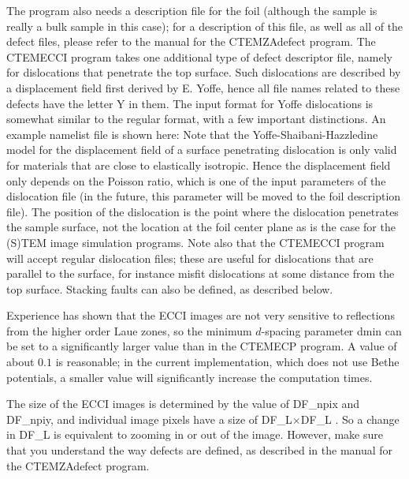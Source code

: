 \documentclass[DIV=calc, paper=letter, fontsize=11pt]{scrartcl}	 %
\begin{document}
The program also needs a description file for the foil (although the sample is really a bulk sample in this case); for a description 
of this file, as well as all of the defect files, please refer to the manual for the \textsf{CTEMZAdefect} program.  The \textsf{CTEMECCI}
program takes one additional type of defect descriptor file, namely for dislocations that penetrate the top surface.  Such dislocations
are described by a displacement field first derived by E. Yoffe, hence all file names related to these defects have the letter Y in them.
The input format for Yoffe dislocations is somewhat similar to the regular format, with a few important distinctions. An example namelist
file is shown here:
Note that the Yoffe-Shaibani-Hazzledine model for the displacement field of a surface penetrating dislocation is only valid 
for materials that are close to elastically isotropic.  Hence the displacement field only depends on the Poisson ratio, which is
one of the input parameters of the dislocation file (in the future, this parameter will be moved to the foil description file).
The position of the dislocation is the point where the dislocation penetrates the sample surface, not the location at the foil
center plane as is the case for the (S)TEM image simulation programs.  Note also that the \textsf{CTEMECCI} program will accept 
regular dislocation files; these are useful for dislocations that are parallel to the surface, for instance misfit dislocations 
at some distance from the top surface.  Stacking faults can also be defined, as described below.

Experience has shown that the ECCI images are not very sensitive to reflections from the higher order Laue zones, so the minimum
$d$-spacing parameter \textsf{dmin} can be set to a significantly larger value than in the \textsf{CTEMECP} program.  A value of 
about $0.1$ is reasonable; in the current implementation, which does not use Bethe potentials, a smaller value will significantly 
increase the computation times.

The size of the ECCI images is determined by the value of \textsf{DF\_npix} and \textsf{DF\_npiy}, and individual image pixels have a size 
of \textsf{DF\_L}$\times$\textsf{DF\_L} \nano\squaren\meter.  So a change in \textsf{DF\_L} is equivalent to zooming in or out of the image.
However, make sure that you understand the way defects are defined, as described in the manual for the \textsf{CTEMZAdefect} program.
\end{document}
